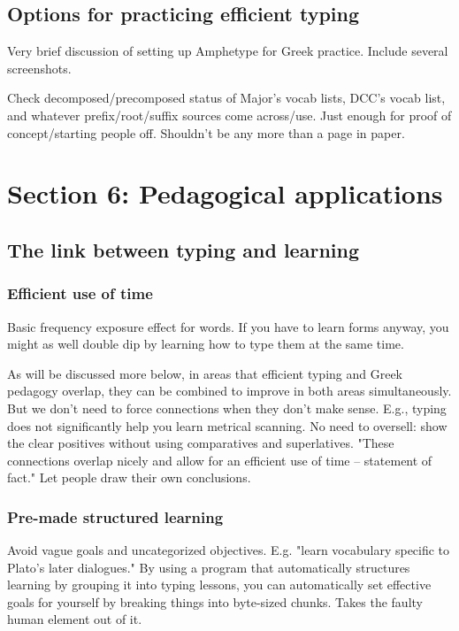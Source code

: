 \documentclass[11pt]{article}
\begin{document}
\subsection{Options for practicing efficient typing}
\label{sec:orgad16dd9}

Very brief discussion of setting up Amphetype for Greek practice. Include several screenshots.

Check decomposed/precomposed status of Major's vocab lists, DCC's vocab list, and whatever prefix/root/suffix sources come across/use. Just enough for proof of concept/starting people off. Shouldn't be any more than a page in paper.


\section{Section 6: Pedagogical applications}
\label{sec:org03e660e}

\subsection{The link between typing and learning}
\label{sec:org1efc9e3}

\subsubsection{Efficient use of time}
\label{sec:org1d15824}

Basic frequency exposure effect for words. If you have to learn forms anyway, you might as well double dip by learning how to type them at the same time.

As will be discussed more below, in areas that efficient typing and Greek pedagogy overlap, they can be combined to improve in both areas simultaneously. But we don't need to force connections when they don't make sense. E.g., typing does not significantly help you learn metrical scanning. No need to oversell: show the clear positives without using comparatives and superlatives. "These connections overlap nicely and allow for an efficient use of time -- statement of fact." Let people draw their own conclusions.

\subsubsection{Pre-made structured learning}
\label{sec:org8387482}

Avoid vague goals and uncategorized objectives. E.g. "learn vocabulary specific to Plato's later dialogues." By using a program that automatically structures learning by grouping it into typing lessons, you can automatically set effective goals for yourself by breaking things into byte-sized chunks. Takes the faulty human element out of it. 
\end{document}
